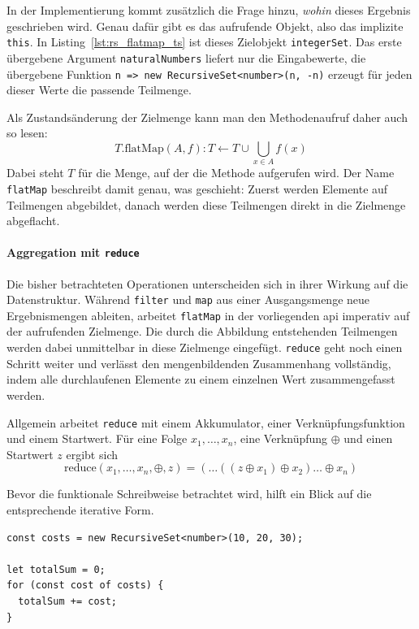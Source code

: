 In der Implementierung kommt zusätzlich die Frage hinzu, \emph{wohin} dieses Ergebnis geschrieben wird. Genau dafür gibt es das aufrufende Objekt, also das implizite \texttt{this}. In Listing~\ref{lst:rs_flatmap_ts} ist dieses Zielobjekt \texttt{integerSet}. Das erste übergebene Argument \texttt{naturalNumbers} liefert nur die Eingabewerte, die übergebene Funktion \texttt{n => new RecursiveSet<number>(n, -n)} erzeugt für jeden dieser Werte die passende Teilmenge.

Als Zustandsänderung der Zielmenge kann man den Methodenaufruf daher auch so lesen:
\[
T.\mathrm{flatMap}(A, f) : T \leftarrow T \cup \bigcup_{x \in A} f(x)
\]
Dabei steht \(T\) für die Menge, auf der die Methode aufgerufen wird. Der Name \texttt{flatMap} beschreibt damit genau, was geschieht: Zuerst werden Elemente auf Teilmengen abgebildet, danach werden diese Teilmengen direkt in die Zielmenge abgeflacht.

\paragraph{Aggregation mit \texttt{reduce}}
Die bisher betrachteten Operationen unterscheiden sich in ihrer Wirkung auf die Datenstruktur. Während \texttt{filter} und \texttt{map} aus einer Ausgangsmenge neue Ergebnismengen ableiten, arbeitet \texttt{flatMap} in der vorliegenden \gls{api} imperativ auf der aufrufenden Zielmenge. Die durch die Abbildung entstehenden Teilmengen werden dabei unmittelbar in diese Zielmenge eingefügt. \texttt{reduce} geht noch einen Schritt weiter und verlässt den mengenbildenden Zusammenhang vollständig, indem alle durchlaufenen Elemente zu einem einzelnen Wert zusammengefasst werden.

Allgemein arbeitet \texttt{reduce} mit einem Akkumulator, einer Verknüpfungsfunktion und einem Startwert. Für eine Folge \(x_1, \dots, x_n\), eine Verknüpfung \(\oplus\) und einen Startwert \(z\) ergibt sich
\[
\mathrm{reduce}(x_1, \dots, x_n, \oplus, z)
=
(\dots ((z \oplus x_1) \oplus x_2) \dots \oplus x_n)
\]

Bevor die funktionale Schreibweise betrachtet wird, hilft ein Blick auf die entsprechende iterative Form.

\begin{listing}[ht]
    \caption{Iterative Aggregation in TypeScript}
    \label{lst:rs_reduce_iterative_ts}
    \begin{verbatim}
const costs = new RecursiveSet<number>(10, 20, 30);

let totalSum = 0;
for (const cost of costs) {
  totalSum += cost;
}
    \end{verbatim}
\end{listing}

